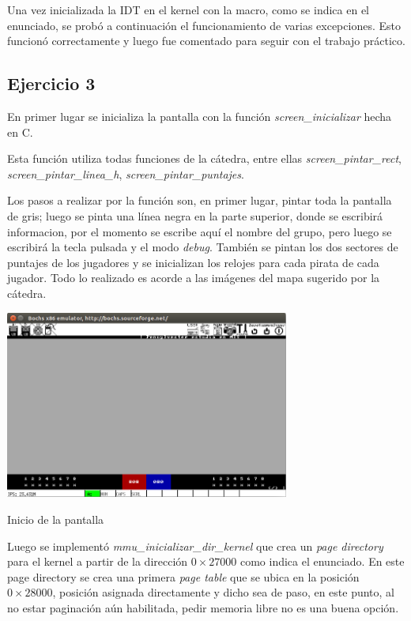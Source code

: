Una vez inicializada la IDT en el kernel con la macro, como se indica en el
enunciado, se probó a continuación el funcionamiento de varias excepciones.
Esto funcionó correctamente y luego fue comentado para seguir con el trabajo
práctico.



\subsection{Ejercicio 3}

En primer lugar se inicializa la pantalla con la función
{\it screen_inicializar\/} hecha en C.

Esta función utiliza todas funciones de la cátedra, entre ellas
{\it screen_pintar_rect\/}, {\it screen_pintar_linea_h\/},
{\it screen_pintar_puntajes\/}.

Los pasos a realizar por la función son, en primer lugar, pintar toda la
pantalla de gris; luego se pinta una línea negra en la parte superior, donde se
escribirá informacion, por el momento se escribe aquí el nombre del grupo, pero
luego se escribirá la tecla pulsada y el modo {\it debug\/}.
También se pintan los dos sectores de puntajes de los jugadores y se inicializan
los relojes para cada pirata de cada jugador. Todo lo realizado es acorde a las
imágenes del mapa sugerido por la cátedra.

\begin{center}
\includegraphics[width=0.7\textwidth]{imagenes/mapa1.png}

Inicio de la pantalla
\end{center}

Luego se implementó {\it mmu_inicializar_dir_kernel\/} que crea un
{\it page directory\/} para el kernel a partir de la dirección $0\times27000$
como indica el enunciado. En este page directory se crea una primera
{\it page table\/} que se ubica en la posición $0\times28000$, posición
asignada directamente y dicho sea de paso, en este punto, al no estar paginación
aún habilitada, pedir memoria libre no es una buena opción.

